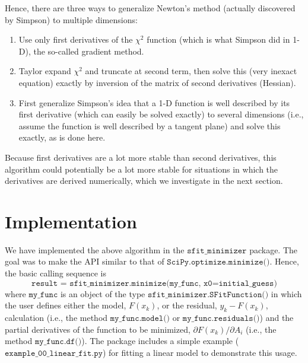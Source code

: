 \documentclass[preprint]{aastex631}
\newcommand{\minimize}{$\texttt{SciPy.optimize.minimize()}$}
\begin{document}
Hence, there are three ways to generalize Newton's method (actually discovered by Simpson)
to multiple dimensions:
\begin{enumerate}
\item{Use only first derivatives of the $\chi^2$ function (which is what Simpson did in
   1-D), the so-called gradient method.}
\item{Taylor expand $\chi^2$ and truncate at second term, then
   solve this (very inexact equation) exactly by inversion
   of the matrix of second derivatives (Hessian).}
\item{First generalize Simpson's idea that a 1-D function is well
   described by its first derivative (which can easily be solved
   exactly) to several dimensions (i.e., assume the function is well
   described by a tangent plane) and solve this exactly, as is done here.}
\end{enumerate}

Because first derivatives are a lot more stable than second derivatives, this algorithm could potentially be a lot more stable for situations in which the derivatives are derived
numerically, which we investigate in the next section.

\section{Implementation}

We have implemented the above algorithm in the $\texttt{sfit\_minimizer}$ package. The goal was to make the API similar to that of \minimize. Hence, the basic calling sequence is
\begin{equation}
\texttt{result = sfit\_minimizer.minimize(my\_func, x0=initial\_guess)}
\end{equation}
where $\texttt{my\_func}$ is an object of the type $\texttt{sfit\_minimizer.SFitFunction()}$ in which the user defines either the model, $F(x_k)$, or the residual, $y_k - F(x_k)$, calculation (i.e., the method $\texttt{my\_func.model()}$ or $\texttt{my\_func.residuals()}$) and the partial derivatives of the function to be minimized, $\partial F(x_k) / \partial A_i$ (i.e., the method $\texttt{my\_func.df()}$). The package includes a simple example ($\texttt{example\_00\_linear\_fit.py}$) for fitting a linear model to demonstrate this usage.
\end{document}
